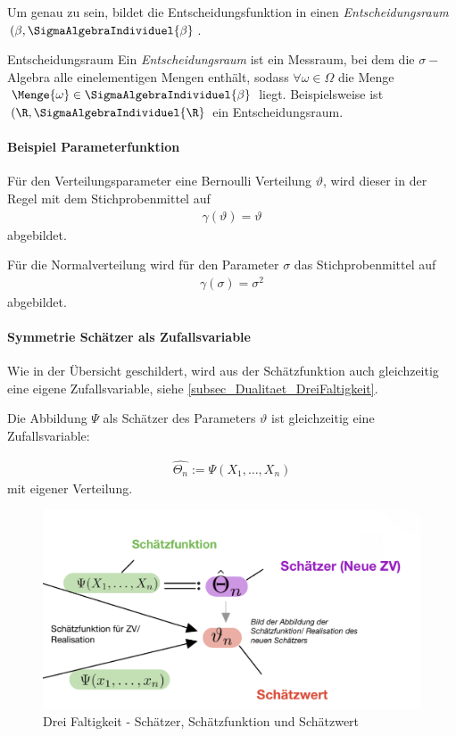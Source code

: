 Um genau zu sein, bildet die Entscheidungsfunktion in einen \textit{Entscheidungsraum} $(\beta, \SigmaAlgebraIndividuel{\beta}$.
\begin{Lemma-Definition}{Entscheidungsraum}
	Ein \textit{Entscheidungsraum} ist ein Messraum, bei dem die $\sigma-$Algebra alle einelementigen Mengen enthält, sodass $\forall \omega\in \Omega $ die Menge $\Menge{\omega} \in \SigmaAlgebraIndividuel{\beta}$ liegt. Beispielsweise ist $(\R, \SigmaAlgebraIndividuel{\R}$ ein Entscheidungsraum.
\end{Lemma-Definition}

\paragraph{Beispiel Parameterfunktion}
Für den Verteilungsparameter eine Bernoulli Verteilung $\vartheta$, wird dieser in der Regel mit dem Stichprobenmittel auf 
\begin{align}
	\gamma(\vartheta)=\vartheta
\end{align}
abgebildet.

Für die Normalverteilung wird für den Parameter $\sigma$ das Stichprobenmittel
auf 
\begin{align}
	\gamma(\sigma)=\sigma^2
\end{align}
abgebildet.

\paragraph{Symmetrie Schätzer als Zufallsvariable}

Wie in der Übersicht geschildert, wird aus der Schätzfunktion auch gleichzeitig eine eigene Zufallsvariable, siehe \ref{subsec_Dualitaet_DreiFaltigkeit}.

Die Abbildung $\Psi$ als Schätzer des Parameters $\vartheta$ ist gleichzeitig eine Zufallsvariable:

\begin{align}
	\hat{\Theta_n} := \Psi(X_1, \dots, X_n)
\end{align}
mit eigener Verteilung.

\begin{figure}[H]
	\centering
	\includegraphics[width=0.7\linewidth]{attachment/chapter_13/Scc073}
	\caption{Drei Faltigkeit - Schätzer, Schätzfunktion und Schätzwert}
\end{figure}

